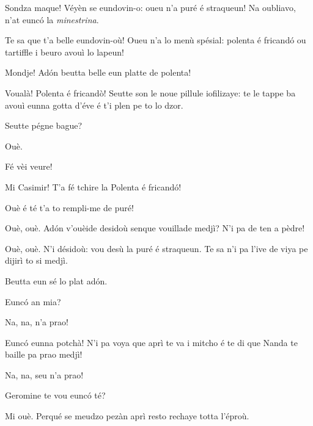 \begin{drama}
\Gerominespeaks Sondza maque! Véyèn se eundovin-o: oueu n’a puré é straqueun! Na oubliavo, n’at eunc\'o la \textit{minestrina}.

\Fernandaspeaks Te sa que t’a belle eundovin-où! Oueu n'a lo menù spésial: polenta é fricand\'o ou tartiffle i beuro avouì lo lapeun!

\Casimirspeaks Mondje! Ad\'on beutta belle eun platte de polenta!


\Fernandaspeaks Voualà! Polenta é fricandò! Seutte son le noue pillule iofilizaye: te le tappe ba avouì eunna gotta d'éve é t'i plen pe to lo dzor.

\Casimirspeaks Seutte pégne bague?

\Fernandaspeaks  Ouè.

\Gerominespeaks{} Fé vèi veure!


\Fernandaspeaks Mi Casimir! T’a fé tchire la Polenta é fricand\'o! 

\Casimirspeaks Ouè é té t'a to rempli-me de puré!

\Fernandaspeaks {} Ouè, ouè. Ad\'on v'ouèide desidoù senque vouillade medjì? N'i pa de ten a pèdre!

\Casimirspeaks Ouè, ouè. N'i désidoù: vou desù la puré é straqueun. Te sa n’i pa l’ive de viya pe dijirì to si medjì.

\Fernandaspeaks Beutta eun sé lo plat ad\'on.


\Fernandaspeaks  Eunc\'o an mia?

\Casimirspeaks  Na, na, n'a prao!


\Fernandaspeaks Eunc\'o eunna potchà! N'i pa voya que aprì te va i mi\-tcho é te di que Nanda te baille pa prao medjì!

\Casimirspeaks Na, na, seu n'a prao!

\Fernandaspeaks{} Geromine te vou eunc\'o té?

\Gerominespeaks Mi ouè. Perqué se meudzo pezàn aprì resto rechaye totta l'éproù.


\end{drama}
